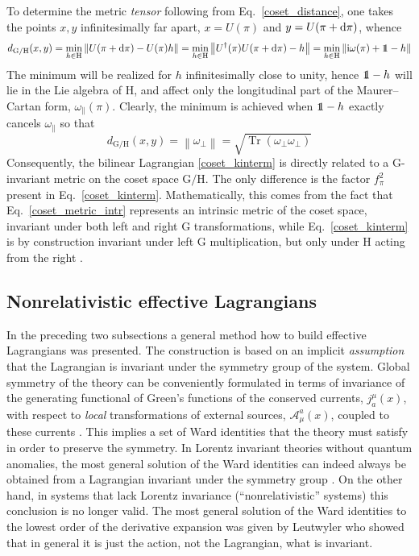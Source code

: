 \documentclass[final,3p,times,12pt,a4paper,sort&compress]{elsarticle}
\newcommand\gr[1]{\mathrm{#1}}              %
\newcommand\AAA{\mathscr{A}}                %
\newcommand\he[1]{#1^{\dagger}}             %
\newcommand\imag{\mathrm i}                 %
\DeclareRobustCommand\openone{\leavevmode\hbox{\small1\normalsize\kern-.33em1}}
\newcommand\nor[1]{\left\|#1\right\|}       %
\newcommand\dd{\mathop{{\rm d}\!}\nolimits} %
\DeclareMathOperator{\Tr}{Tr}
\begin{document}
To determine the metric \emph{tensor} following from
Eq.~\eqref{coset_distance}, one takes the points $x,y$ infinitesimally far
apart, $x=U(\pi)$ and $y=U(\pi+\dd\pi)$, whence
\begin{equation}
d_{\gr{G/H}}(x,y)=\min_{h\in\gr H}\nor{U(\pi+\dd\pi)-U(\pi)h}=
\min_{h\in\gr H}\nor{\he U(\pi)U(\pi+\dd\pi)-h}=
\min_{h\in\gr H}\nor{\imag\omega(\pi)+\openone-h}
\end{equation}
The minimum will be realized for $h$ infinitesimally close to unity, hence
$\openone-h$ will lie in the Lie algebra of $\gr H$, and affect only the
longitudinal part of the Maurer--Cartan form, $\omega_\parallel(\pi)$. Clearly,
the minimum is achieved when $\openone-h$ exactly cancels
$\omega_\parallel$ so that
\begin{equation}
d_{\gr{G/H}}(x,y)=\nor{\omega_\perp}=\sqrt{\Tr(\omega_\perp\omega_\perp)}
\label{coset_metric_intr}
\end{equation}
Consequently, the bilinear Lagrangian \eqref{coset_kinterm} is directly related
to a $\gr G$-invariant metric on the coset space $\gr{G/H}$. The only
difference is the factor $f_\pi^2$ present in Eq.~\eqref{coset_kinterm}.
Mathematically, this comes from the fact that Eq.~\eqref{coset_metric_intr}
represents an intrinsic metric of the coset space, invariant under both left
and right $\gr G$ transformations, while Eq.~\eqref{coset_kinterm} is by
construction invariant under left $\gr G$ multiplication, but only under $\gr
H$ acting from the right \cite{Leutwyler:1993iq}.


\subsection{Nonrelativistic effective Lagrangians}
In the preceding two subsections a general method how to build effective
Lagrangians was presented. The construction is based on an implicit
\emph{assumption} that the Lagrangian is invariant under the symmetry group of
the system. Global symmetry of the theory can be conveniently formulated in
terms of invariance of the generating functional of Green's functions of the
conserved currents, $j^\mu_a(x)$, with respect to \emph{local} transformations
of external sources, $\AAA^a_\mu(x)$, coupled to these currents
\cite{Gasser:1983yg,Gasser:1984gg}. This implies a set of Ward identities that
the theory must satisfy in order to preserve the symmetry. In Lorentz
invariant theories without quantum anomalies, the most general solution of the
Ward identities can indeed always be obtained from a Lagrangian invariant under
the symmetry group \cite{Leutwyler:1993iq}. On the other hand, in systems that
lack Lorentz invariance (``nonrelativistic'' systems) this conclusion is no
longer valid. The most general solution of the Ward identities to the lowest
order of the derivative expansion was given by Leutwyler \cite{Leutwyler:1993gf}
who showed that in general it is just the action, not the Lagrangian, what is
invariant.
\end{document}
